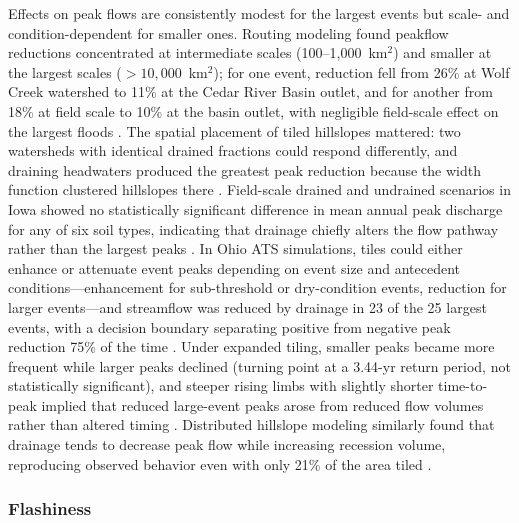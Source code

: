 Effects on peak flows are consistently modest for the largest events but scale- and condition-dependent for smaller ones. Routing modeling found peakflow reductions concentrated at intermediate scales (100--1{,}000~km$^2$) and smaller at the largest scales ($>10{,}000$~km$^2$); for one event, reduction fell from 26\% at Wolf Creek watershed to 11\% at the Cedar River Basin outlet, and for another from 18\% at field scale to 10\% at the basin outlet, with negligible field-scale effect on the largest floods \parencite{Sloan2017}. The spatial placement of tiled hillslopes mattered: two watersheds with identical drained fractions could respond differently, and draining headwaters produced the greatest peak reduction because the width function clustered hillslopes there \parencite{Sloan2017}. Field-scale drained and undrained scenarios in Iowa showed no statistically significant difference in mean annual peak discharge for any of six soil types, indicating that drainage chiefly alters the flow pathway rather than the largest peaks \parencite{Sloan2016}. In Ohio ATS simulations, tiles could either enhance or attenuate event peaks depending on event size and antecedent conditions---enhancement for sub-threshold or dry-condition events, reduction for larger events---and streamflow was reduced by drainage in 23 of the 25 largest events, with a decision boundary separating positive from negative peak reduction 75\% of the time \parencite{Rathore2025}. Under expanded tiling, smaller peaks became more frequent while larger peaks declined (turning point at a 3.44-yr return period, not statistically significant), and steeper rising limbs with slightly shorter time-to-peak implied that reduced large-event peaks arose from reduced flow volumes rather than altered timing \parencite{Rahman2014}. Distributed hillslope modeling similarly found that drainage tends to decrease peak flow while increasing recession volume, reproducing observed behavior even with only 21\% of the area tiled \parencite{Fonley2021}.

\subsubsection{Flashiness}

